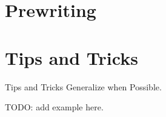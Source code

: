 \documentclass[main.tex]{subfile}
\begin{document}

\section{Prewriting} 
\label{sec:prewriting}


\section{Tips and Tricks} 
\label{sec:tips_and_tricks}

\begin{frame}{Tips and Tricks}
	Generalize when Possible.

	TODO: add example here.
\end{frame}

\end{document}
